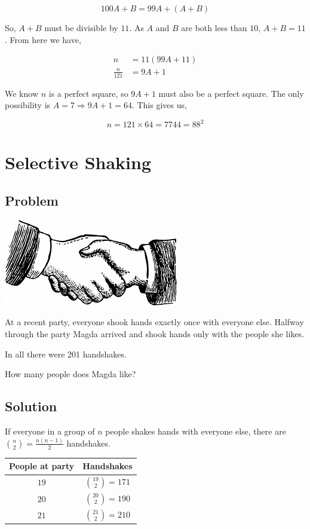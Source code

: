 \documentclass{article}
\begin{document}
\begin{equation*}
100A+B=99A+(A+B)
\end{equation*}

So, \(A+B\) must be divisible by \(11\). As \(A\) and \(B\) are both less than \(10\), \(A+B=11\). From here we have,

\begin{align*}
  n&=11(99A+11)\\
  \frac{n}{121}&=9A+1
\end{align*}

We know \(n\) is a perfect square, so \(9A+1\) must also be a perfect square. The only possibility is \(A=7 \Rightarrow 9A+1=64\). This gives us,

\begin{equation*}
n=121\times 64=7744=88^2
\end{equation*}

\newpage

\section{Selective Shaking}
\subsection{Problem}

\begin{center}
\includegraphics{handshake}
\end{center}

At a recent party, everyone shook hands exactly once with everyone else. Halfway through the party Magda arrived and shook hands only with the people she likes.

In all there were 201 handshakes.

How many people does Magda like?
\subsection{Solution}
\setlength{\parskip}{6pt}
If everyone in a group of \(n\) people shakes hands with everyone else, there are \( {{n}\choose{2}}= \frac{n(n-1)}{2}\) handshakes.
\renewcommand{\arraystretch}{1.5}
\begin{center}
\begin{tabular}{ |c|c| }

 \hline
 People at party & Handshakes \\
 \hline
 \(19\) & \({{19}\choose{2}}=171\) \\
 \(20\) & \({{20}\choose{2}}=190\) \\
 \(21\) & \({{21}\choose{2}}=210\) \\
 \hline
\end{tabular}
\end{center}
\end{document}
